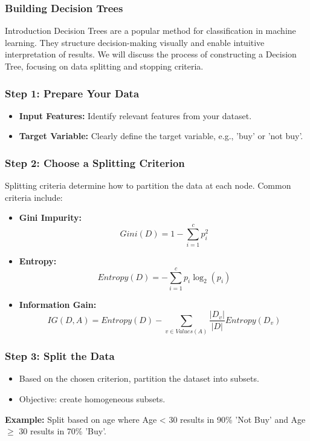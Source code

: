 \documentclass[aspectratio=169]{beamer}
\begin{document}
\begin{frame}[fragile]
    \frametitle{Building Decision Trees}
    \begin{block}{Introduction}
        Decision Trees are a popular method for classification in machine learning. 
        They structure decision-making visually and enable intuitive interpretation of results. 
        We will discuss the process of constructing a Decision Tree, focusing on data splitting and stopping criteria.
    \end{block}
\end{frame}

\begin{frame}[fragile]
    \frametitle{Step 1: Prepare Your Data}
    \begin{itemize}
        \item \textbf{Input Features:} Identify relevant features from your dataset. 
        \item \textbf{Target Variable:} Clearly define the target variable, e.g., 'buy' or 'not buy'.
    \end{itemize}
\end{frame}

\begin{frame}[fragile]
    \frametitle{Step 2: Choose a Splitting Criterion}
    Splitting criteria determine how to partition the data at each node. Common criteria include:
    \begin{itemize}
        \item \textbf{Gini Impurity:} 
        \begin{equation}
            Gini(D) = 1 - \sum_{i=1}^{c} p_i^2
        \end{equation}
        \item \textbf{Entropy:} 
        \begin{equation}
            Entropy(D) = - \sum_{i=1}^{c} p_i \log_2(p_i)
        \end{equation}
        \item \textbf{Information Gain:} 
        \begin{equation}
            IG(D, A) = Entropy(D) - \sum_{v \in Values(A)} \frac{|D_v|}{|D|} Entropy(D_v)
        \end{equation}
    \end{itemize}
\end{frame}

\begin{frame}[fragile]
    \frametitle{Step 3: Split the Data}
    \begin{itemize}
        \item Based on the chosen criterion, partition the dataset into subsets.
        \item Objective: create homogeneous subsets.
    \end{itemize}
    \textbf{Example:} Split based on age where Age < 30 results in 90\% 'Not Buy' and Age $\geq$ 30 results in 70\% 'Buy'.
\end{frame}
\end{document}
